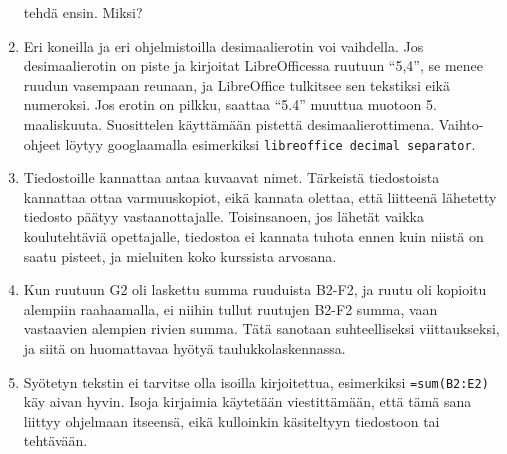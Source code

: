 \documentclass[12pt,leqno,a4paper,oneside]{amsart}
\theoremstyle{definition}
\theoremstyle{remark}
\numberwithin{equation}{section}
\begin{document}
\begin{enumerate}
 tehdä ensin. Miksi?
 \item
 Eri koneilla ja eri ohjelmistoilla desimaalierotin voi vaihdella. Jos desimaalierotin on piste ja kirjoitat LibreOfficessa ruutuun ``5,4'', se menee
 ruudun vasempaan reunaan, ja LibreOffice tul\-kit\-see sen tekstiksi eikä numeroksi. Jos erotin on pilkku, saattaa ``5.4'' muuttua muotoon 5. maaliskuuta.
 Suosittelen käyttämään pistettä desimaalierottimena. Vaihto-ohjeet löytyy googlaamalla esimerkiksi \texttt{libreoffice decimal separator}. 
 \item
 Tiedostoille kannattaa antaa kuvaavat nimet. Tärkeistä tiedostoista kannattaa ottaa varmuuskopiot, eikä kannata olettaa, että liitteenä lähetetty
 tiedosto päätyy vastaanottajalle. Toisinsanoen, jos lähetät vaikka koulutehtäviä opettajalle, tiedostoa ei kannata tuhota ennen kuin niistä on saatu
 pisteet, ja mieluiten koko kurssista arvosana.
 \item
 Kun ruutuun G2 oli laskettu summa ruuduista B2-F2, ja ruu\-tu oli kopioitu alempiin raahaamalla, ei niihin tullut ruutujen B2-F2 summa, vaan vastaavien
 alempien rivien summa. Tätä sanotaan suhteelliseksi viittaukseksi, ja siitä on huomattavaa hyötyä taulukkolaskennassa.
 \item
 Syötetyn tekstin ei tarvitse olla isoilla kirjoitettua, esimerkiksi \texttt{=sum(B2:E2)} käy aivan hyvin. Isoja kirjaimia käytetään vies\-tit\-tä\-mään,
 että tämä sana liittyy ohjelmaan itseensä, eikä kulloinkin käsiteltyyn tiedostoon tai tehtävään.
\end{enumerate}
\end{document}
